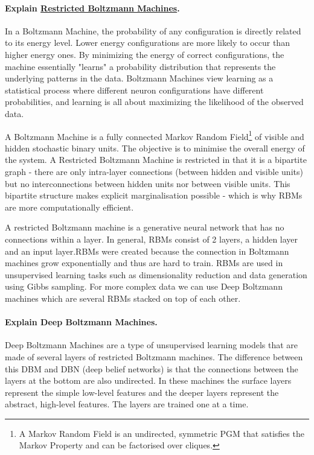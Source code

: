 \paragraph{Explain \href{https://medium.com/@heyamit10/a-complete-guide-to-boltzmann-machine-deep-learning-98f8eccfd506}{Restricted Boltzmann Machines}.}

In a Boltzmann Machine, the probability of any configuration is directly related to its energy level.
Lower energy configurations are more likely to occur than higher energy ones.
By minimizing the energy of correct configurations,
the machine essentially "learns" a probability distribution that represents the underlying patterns in the data.
Boltzmann Machines view learning as a statistical process where different neuron configurations have different probabilities,
and learning is all about maximizing the likelihood of the observed data.

A Boltzmann Machine is a fully connected Markov Random Field\footnote{
    A Markov Random Field is an undirected, symmetric PGM that satisfies the Markov Property and can be factorised over cliques.
} of visible and hidden stochastic binary units.
The objective is to minimise the overall energy of the system.
A Restricted Boltzmann Machine is restricted in that it is a bipartite graph -
there are only intra-layer connections (between hidden and visible units)
but no interconnections between hidden units nor between visible units.
This bipartite structure makes explicit marginalisation possible -
which is why RBMs are more computationally efficient.

A restricted Boltzmann machine is a generative neural network that has no connections within a layer.
In general, RBMs consist of 2 layers, a hidden layer and an input layer.RBMs were created because the
connection in Boltzmann machines grow exponentially and thus are hard to train. RBMs are used in
unsupervised learning tasks such as dimensionality reduction and data generation using Gibbs
sampling. For more complex data we can use Deep Boltzmann machines which are several RBMs
stacked on top of each other.

\paragraph{Explain Deep Boltzmann Machines.}

Deep Boltzmann Machines are a type of unsupervised learning models that are made of several layers
of restricted Boltzmann machines. The difference between this DBM and DBN (deep belief networks)
is that the connections between the layers at the bottom are also undirected. In these machines the
surface layers represent the simple low-level features and the deeper layers represent the abstract,
high-level features. The layers are trained one at a time.


